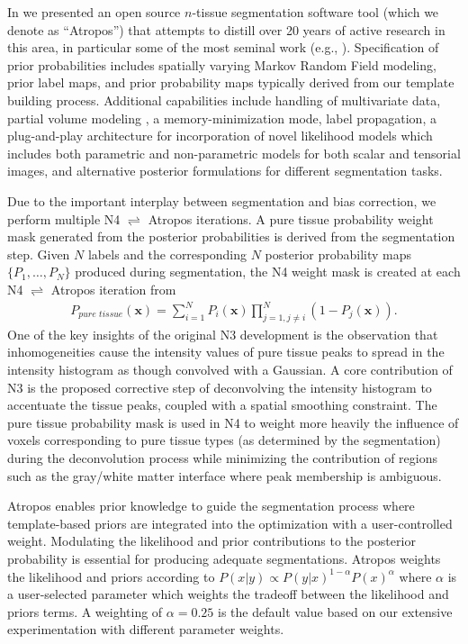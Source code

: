 In \cite{avants2011a} we presented an open source $n$-tissue segmentation software tool
(which we denote as ``Atropos'') that attempts to distill over 20 years of active research in this area,
in particular some of the most seminal work (e.g., \cite{zhang2001,ashburner2005}).
Specification of prior probabilities includes spatially varying Markov Random Field modeling, 
prior label maps, and prior probability maps typically derived from our template building 
process.  Additional
capabilities include handling of multivariate data, 
partial volume modeling \citep{shattuck2001}, a memory-minimization mode,
label propagation, a plug-and-play architecture for incorporation of novel likelihood models
which includes both parametric and non-parametric models for both scalar and tensorial
images, and alternative posterior formulations for different segmentation tasks.

Due to the important interplay between segmentation and bias correction,
we perform multiple N4 $\rightleftharpoons$ Atropos iterations.
A pure tissue probability weight mask generated from the 
posterior probabilities is derived from the segmentation 
step.  Given $N$ labels and the corresponding $N$
posterior probability maps $\{ P_1, \ldots, P_N\}$ produced
during segmentation, the N4 weight mask is 
created at each N4 $\rightleftharpoons$ Atropos iteration from
\begin{align}
  P_{pure\,\,tissue}(\mathbf{x}) = \sum_{i=1}^N P_i(\mathbf{x}) \prod_{j=1, j \neq i}^N \left( 1 - P_j(\mathbf{x}) \right).
\end{align}
One of the key insights of the original N3 development is the
observation that inhomogeneities cause the intensity values of
pure tissue peaks to spread in the intensity histogram as though
convolved with a Gaussian.  A core contribution of N3 is the
proposed corrective step of deconvolving the intensity histogram to
accentuate the tissue peaks, coupled with a spatial smoothing
constraint. The pure tissue probability mask is used in N4 to weight
more heavily the influence of voxels corresponding to pure tissue 
types (as determined by the segmentation) during the deconvolution process 
while minimizing the contribution of regions such as the gray/white matter 
interface where peak membership is ambiguous. 

Atropos enables prior knowledge to guide the
segmentation process where template-based priors are integrated into the optimization
with a user-controlled weight.  Modulating the likelihood and prior contributions
to the posterior probability is essential for producing adequate segmentations.
Atropos weights the likelihood and priors according to
$P(x|y) \propto P(y|x)^{1-\alpha}P(x)^{\alpha}$
where $\alpha$ is a user-selected parameter which weights the tradeoff between the likelihood and priors terms.  A weighting of $\alpha = 0.25$ is the default value based 
on our extensive experimentation with different parameter weights.


